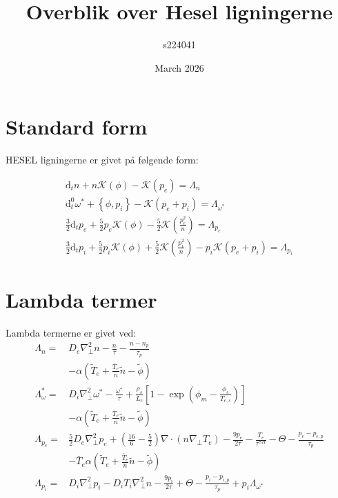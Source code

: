 \documentclass{article}
\title{Overblik over Hesel ligningerne}
\author{s224041}
\date{March 2026}
\begin{document}
\maketitle
\newpage

\section{Standard form}

HESEL ligningerne er givet på følgende form:

\begin{gather*}
    \mathrm{d} _t n + n\mathcal{K}(\phi) - \mathcal{K}(p_e) = \Lambda_n  \label{tæthedsligning} \\ 
    \mathrm{d}_t^0 \omega^* + \left\{\phi, p_i \right\} - \mathcal{K}(p_e+p_i)=\Lambda_{\omega^*} \label{vorticiteten} \\
    \frac{3}{2}\mathrm{d} _t p_e + \frac{5}{2}p_e \mathcal{K}(\phi) -\frac{5}{2}\mathcal{K}\left(\frac{p_e^2}{n}\right)= \Lambda_{p_e}\label{elektrontryksligning} \\
    \frac{3}{2}\mathrm{d} _t p_i + \frac{5}{2}p_i \mathcal{K}(\phi) +\frac{5}{2}\mathcal{K}\left(\frac{p_i^2}{n}\right) - p_i\mathcal{K}(p_e+p_i) = \Lambda_{p_i} \label{iontryksligning}
\end{gather*}


\section{Lambda termer}
Lambda termerne er givet ved:
\begin{align*}
\Lambda_n =& D_e\nabla_\perp^2 n -\frac{n}{\tau} -\frac{n-n_p}{\tau_p}\\ 
            &-\alpha\left(\tilde T_e+ \frac{\bar T_e}{\bar n}\tilde n-\tilde\phi\right)\\ 
\Lambda_\omega^{*}=& D_i\nabla_\perp^2\omega^{*}-\frac{\omega^{*}}{\tau}+\frac{\rho_s}{L_c}\left[1-\exp\left(\phi_m-\frac{\phi_s}{T_{e,s}}\right)\right] \\
            &-\alpha\left( \tilde T_e+ \frac{\bar T_e}{\bar n}\tilde n -\tilde\phi \right)\\
\Lambda_{p_e} =& \frac{5}{2}D_e\nabla_\perp^2 p_e  + \left(\frac{16}{6} - \frac{5}{2}\right)\nabla\cdot\left(n\nabla_\perp T_e\right) - \frac{9p_e}{2\tau} - \frac{T_e}{\tau^{SH}}-\Theta -\frac{p_e-p_{e,p}}{\tau_p} \\
            &-\bar T_e \alpha\left( \tilde T_e + \frac{\bar T_e}{\bar n}\tilde n -\tilde\phi \right)\\
\Lambda_{p_i} =& D_i\nabla_\perp^2 p_i - D_iT_i\nabla_\perp^2n - \frac{9p_i}{2\tau} +\Theta -\frac{p_i-p_{i,p}}{\tau_p} +p_i\Lambda_{\omega^*}
\end{align*}
\end{document}
